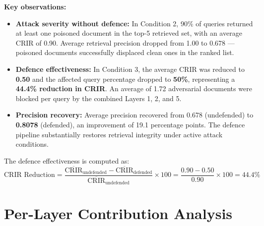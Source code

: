 \textbf{Key observations:}
\begin{itemize}
    \item \textbf{Attack severity without defence:} In Condition 2, 90\% of queries returned at least one poisoned document in the top-5 retrieved set, with an average CRIR of 0.90. Average retrieval precision dropped from 1.00 to 0.678 --- poisoned documents successfully displaced clean ones in the ranked list.
    \item \textbf{Defence effectiveness:} In Condition 3, the average CRIR was reduced to \textbf{0.50} and the affected query percentage dropped to \textbf{50\%}, representing a \textbf{44.4\% reduction in CRIR}. An average of 1.72 adversarial documents were blocked per query by the combined Layers 1, 2, and 5.
    \item \textbf{Precision recovery:} Average precision recovered from 0.678 (undefended) to \textbf{0.8078} (defended), an improvement of 19.1 percentage points. The defence pipeline substantially restores retrieval integrity under active attack conditions.
\end{itemize}

The defence effectiveness is computed as:
\begin{equation}
\text{CRIR Reduction} = \frac{\overline{\text{CRIR}}_{\text{undefended}} - \overline{\text{CRIR}}_{\text{defended}}}{\overline{\text{CRIR}}_{\text{undefended}}} \times 100 = \frac{0.90 - 0.50}{0.90} \times 100 = \mathbf{44.4\%}
\end{equation}

\section{Per-Layer Contribution Analysis}


